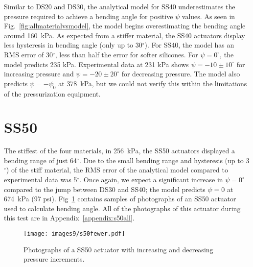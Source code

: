 \clearpage
Similar to DS20 and DS30, the analytical model for SS40 underestimates the pressure required to achieve a bending angle for positive $\psi$ values. As seen in Fig.~\ref{fig:allmaterialvsmodel}, the model begins overestimating the bending angle around 160~kPa. As expected from a stiffer material, the SS40 actuators display less hysteresis in bending angle (only up to 30$^\circ$). For SS40, the model has an RMS error of 30$^\circ$, less than half the error for softer silicones. For $\psi=0^\circ$, the model predicts 235 kPa. Experimental data at 231 kPa shows $\psi=-10\pm10^\circ$ for increasing pressure and $\psi=-20\pm20^\circ$ for decreasing pressure. The model also predicts $\psi=-\psi_0$ at 378~kPa, but we could not verify this within the limitations of the pressurization equipment. 

\clearpage
\section{SS50}

The stiffest of the four materials, in 256~kPa, the SS50 actuators displayed a bending range of just 64$^\circ$. Due to the small bending range and hysteresis (up to 3$^\circ$) of the stiff material, the RMS error of the analytical model compared to experimental data was 5$^\circ$. Once again, we expect a significant increase in $\psi=0^\circ$ compared to the jump between DS30 and SS40; the model predicts $\psi=0$ at 674~kPa (97 psi). Fig~\ref{fig:s50fewer} contains samples of photographs of an SS50 actuator used to calculate bending angle. All of the photographs of this actuator during this test are in Appendix~\ref{appendix:s50all}. 
\\
\begin{figure}[ht]
    \centering
     \texttt{[image: images9/s50fewer.pdf]}
    \caption{Photographs of a SS50 actuator with increasing and decreasing pressure increments.}
    \label{fig:s50fewer}
\end{figure}
